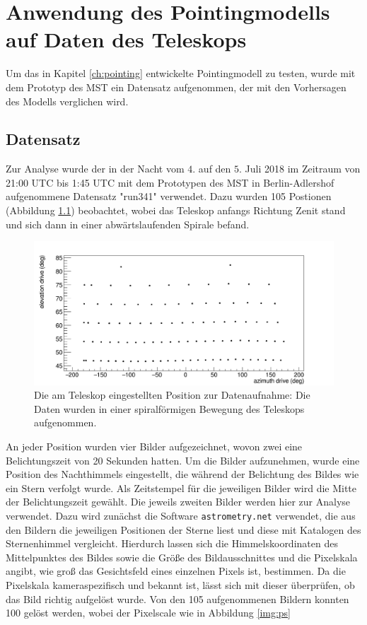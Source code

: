 \chapter{Anwendung des Pointingmodells auf Daten des Teleskops}
\label{ch:auswertung}
Um das in Kapitel \ref{ch:pointing} entwickelte Pointingmodell zu testen, wurde mit dem Prototyp des MST ein Datensatz aufgenommen, der mit den Vorhersagen des Modells verglichen wird.
\section{Datensatz}
\label{se:data}
Zur Analyse wurde der in der Nacht vom $4.$ auf den $5.$ Juli 2018 im Zeitraum von 21:00 UTC bis 1:45 UTC mit dem Prototypen des MST in Berlin-Adlershof aufgenommene Datensatz "run341" verwendet. Dazu wurden 105 Postionen (Abbildung \ref{img:record}) beobachtet, wobei das Teleskop anfangs Richtung Zenit stand und sich dann in einer abwärtslaufenden Spirale befand.
\begin{figure}[htbp]
\centering
\includegraphics[width=\textwidth]{../341/data4.png}
\caption{Die am Teleskop eingestellten Position zur Datenaufnahme: Die Daten wurden in einer spiralförmigen Bewegung des Teleskops aufgenommen.}
\label{img:record}
\end{figure}
An jeder Position wurden vier Bilder aufgezeichnet, wovon zwei eine Belichtungszeit von 20 Sekunden hatten.
Um die Bilder aufzunehmen, wurde eine Position des Nachthimmels eingestellt, die während der Belichtung des Bildes wie ein Stern verfolgt wurde. Als Zeitstempel für die jeweiligen Bilder wird die Mitte der Belichtungszeit gewählt. Die jeweils zweiten Bilder werden hier zur Analyse verwendet. Dazu wird zunächst die Software \texttt{astrometry.net} verwendet, die aus den Bildern die jeweiligen Positionen der Sterne liest und diese mit Katalogen des Sternenhimmel vergleicht. Hierdurch lassen sich die Himmelskoordinaten des Mittelpunktes des Bildes sowie die Größe des Bildausschnittes und die Pixelskala angibt, wie groß das Gesichtsfeld eines einzelnen Pixels ist, bestimmen. Da die Pixelskala kameraspezifisch und bekannt ist, lässt sich mit dieser überprüfen, ob das Bild richtig aufgelöst wurde. Von den 105 aufgenommenen Bildern konnten 100 gelöst werden, wobei der Pixelscale wie in Abbildung \ref{img:ps}
